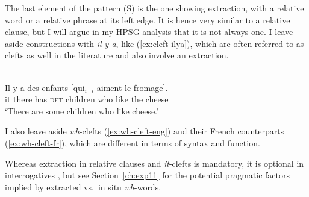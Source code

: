 The last element of the pattern (S) is the one showing extraction, with a relative word or a relative phrase at its left edge. It is hence very similar to a relative clause, but I will argue in my HPSG analysis that it is not always one. I leave aside constructions with \emph{il y a}, like (\ref{ex:cleft-ilya}), which are often referred to as clefts as well in the literature \citep{Lambrecht.1994,Doetjes.2004,Karssenberg.2018} and also involve an extraction. 

\ea \citep[517]{Karssenberg.2018} \nopagebreak \\
\gll Il y a des enfants [qui$_i$~\trace{}$_i$ aiment le fromage].\\
it there has \textsc{det} children who like the cheese\\
\glt `There are some children who like cheese.'
\label{ex:cleft-ilya}
\z 

I also leave aside \emph{wh}-clefts (\ref{ex:wh-cleft-eng}) and their French counterparts (\ref{ex:wh-cleft-fr}), which are different in terms of syntax and function.

\eal 
{}
\zl 

Whereas extraction in relative clauses and \emph{it}-clefts is mandatory, it is optional in interrogatives \citep{Obenauer.1976}, but see Section~\ref{ch:exp11} for the potential pragmatic factors implied by extracted vs.\ in situ \emph{wh}-words.

\eal 
{}
\zl 

